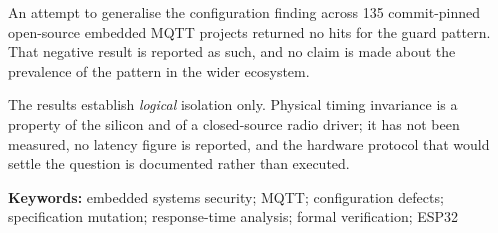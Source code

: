\vspace{6pt}
\noindent An attempt to generalise the configuration finding across 135 commit-pinned
open-source embedded MQTT projects returned no hits for the guard pattern. That negative result
is reported as such, and no claim is made about the prevalence of the pattern in the wider
ecosystem.

\vspace{6pt}
\noindent The results establish \emph{logical} isolation only. Physical timing invariance is a
property of the silicon and of a closed-source radio driver; it has not been measured, no
latency figure is reported, and the hardware protocol that would settle the question is
documented rather than executed.

\vspace{10pt}
\noindent\textbf{Keywords:} embedded systems security; MQTT; configuration defects;
specification mutation; response-time analysis; formal verification; ESP32
